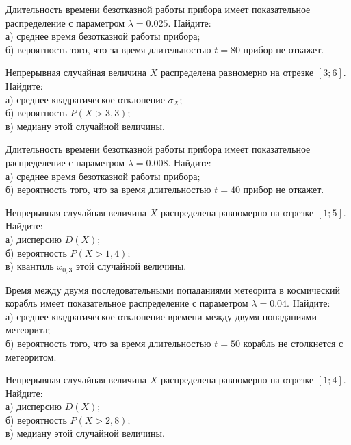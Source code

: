 \vfill

\z Длительность времени безотказной работы прибора имеет показательное распределение с параметром $\lambda = 0.025$. Найдите: \\ \quad а) среднее время безотказной работы прибора; \\ \quad б) вероятность того, что за время длительностью $t = 80$ прибор не откажет.
 

\vfill

\newpage\setcounter{zad}{0}

\z Непрерывная случайная величина $X$ распределена равномерно на отрезке $[3; 6]$. Найдите: \\ \quad а) среднее квадратическое отклонение $\sigma_X$; \\ \quad б) вероятность $P(X>3{,}3)$; \\ \quad в) медиану этой случайной величины.


\vfill

\z Длительность времени безотказной работы прибора имеет показательное распределение с параметром $\lambda = 0.008$. Найдите: \\ \quad а) среднее время безотказной работы прибора; \\ \quad б) вероятность того, что за время длительностью $t = 40$ прибор не откажет.
 

\vfill

\newpage\setcounter{zad}{0}

\z Непрерывная случайная величина $X$ распределена равномерно на отрезке $[1; 5]$. Найдите: \\ \quad а) дисперсию $D(X)$; \\ \quad б) вероятность $P(X>1{,}4)$; \\ \quad в) квантиль $x_{0{,}3}$ этой случайной величины.


\vfill

\z Время между двумя последовательными попаданиями метеорита в космический корабль имеет показательное распределение с параметром $\lambda = 0.04$. Найдите: \\ \quad а) среднее квадратическое отклонение времени между двумя попаданиями метеорита; \\ \quad б) вероятность того, что за время длительностью $t = 50$ корабль не столкнется с метеоритом.
 

\vfill

\newpage\setcounter{zad}{0}

\z Непрерывная случайная величина $X$ распределена равномерно на отрезке $[1; 4]$. Найдите: \\ \quad а) дисперсию $D(X)$; \\ \quad б) вероятность $P(X>2{,}8)$; \\ \quad в) медиану этой случайной величины.


